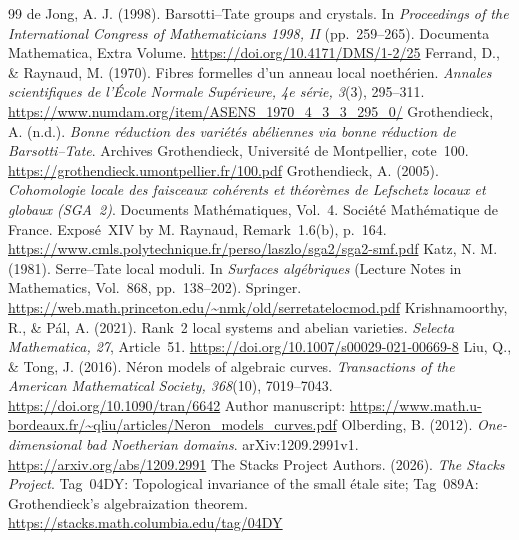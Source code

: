 \documentclass[11pt]{article}
\theoremstyle{remark}\newtheorem{remark}[theorem]{Remark}
\begin{document}
\begin{thebibliography}{99}
de Jong, A. J. (1998). Barsotti--Tate groups and crystals. In \emph{Proceedings of the International Congress of Mathematicians 1998, II} (pp.~259--265). Documenta Mathematica, Extra Volume. \url{https://doi.org/10.4171/DMS/1-2/25}
Ferrand, D., \& Raynaud, M. (1970). Fibres formelles d'un anneau local noeth\'erien. \emph{Annales scientifiques de l'\'Ecole Normale Sup\'erieure, 4e s\'erie, 3}(3), 295--311. \url{https://www.numdam.org/item/ASENS_1970_4_3_3_295_0/}
Grothendieck, A. (n.d.). \emph{Bonne r\'eduction des vari\'et\'es ab\'eliennes via bonne r\'eduction de Barsotti--Tate}. Archives Grothendieck, Universit\'e de Montpellier, cote~100. \url{https://grothendieck.umontpellier.fr/100.pdf}
Grothendieck, A. (2005). \emph{Cohomologie locale des faisceaux coh\'erents et th\'eor\`emes de Lefschetz locaux et globaux (SGA~2)}. Documents Math\'ematiques, Vol.~4. Soci\'et\'e Math\'ematique de France. Expos\'e~XIV by M. Raynaud, Remark~1.6(b), p.~164. \url{https://www.cmls.polytechnique.fr/perso/laszlo/sga2/sga2-smf.pdf}
Katz, N. M. (1981). Serre--Tate local moduli. In \emph{Surfaces alg\'ebriques} (Lecture Notes in Mathematics, Vol.~868, pp.~138--202). Springer. \url{https://web.math.princeton.edu/~nmk/old/serretatelocmod.pdf}
Krishnamoorthy, R., \& P\'al, A. (2021). Rank~2 local systems and abelian varieties. \emph{Selecta Mathematica, 27}, Article~51. \url{https://doi.org/10.1007/s00029-021-00669-8}
Liu, Q., \& Tong, J. (2016). N\'eron models of algebraic curves. \emph{Transactions of the American Mathematical Society, 368}(10), 7019--7043. \url{https://doi.org/10.1090/tran/6642} Author manuscript: \url{https://www.math.u-bordeaux.fr/~qliu/articles/Neron_models_curves.pdf}
Olberding, B. (2012). \emph{One-dimensional bad Noetherian domains}. arXiv:1209.2991v1. \url{https://arxiv.org/abs/1209.2991}
The Stacks Project Authors. (2026). \emph{The Stacks Project}. Tag~04DY: Topological invariance of the small \'etale site; Tag~089A: Grothendieck's algebraization theorem. \url{https://stacks.math.columbia.edu/tag/04DY}
\end{thebibliography}
\end{document}
